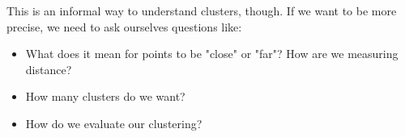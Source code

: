         This is an informal way to understand clusters, though. If we want to be more precise, we need to ask ourselves questions like:
        
        \begin{itemize}
            \item What does it mean for points to be "close" or "far"? How are we measuring distance?
            
            \item How many clusters do we want?
            
            \item How do we evaluate our clustering?
        \end{itemize}
        